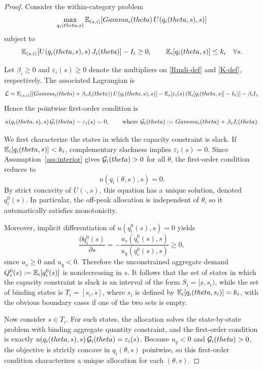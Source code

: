 \documentclass[master.tex]{subfiles}
\begin{document}
\begin{proof}
Consider the within-category problem
\[
\max_{q_i(theta,s)} 
\mathbb{E}_{(s,i)}\!\left[Gamma_i(theta)\,U\!\left(q_i(theta,s),s\right)\right]
\]
subject to
\[
\mathbb{E}_{(s,i)}\!\left[U\!\left(q_i(theta,s),s\right)J_i(theta)\right]-I_i \ge 0,
\qquad
\mathbb{E}_i\!\left[q_i(theta,s)\right]\le k_i
\quad \forall s.
\]

Let \(\beta_i \ge 0\) and \(\varepsilon_i(s)\ge 0\) denote the multipliers on \eqref{Rmdi-def} and \eqref{K-def}, respectively. The associated Lagrangian is
\[
\mathcal L
=
\mathbb{E}_{(s,i)}\!\left[
\left(Gamma_i(theta)+\beta_i J_i(theta)\right)
U\!\left(q_i(theta,s),s\right)
\right]
-
\mathbb{E}_s\!\left[
\varepsilon_i(s)
\left(\mathbb{E}_i[q_i(theta,s)]-k_i\right)
\right]
-
\beta_i I_i.
\]
Hence the pointwise first-order condition is
\[
u\!\left(q_i(theta,s),s\right)\mathcal{G}_i(theta)-\varepsilon_i(s)=0,
\qquad
\text{where }
\mathcal{G}_i(theta):=Gamma_i(theta)+\beta_i J_i(theta).
\]

We first characterize the states in which the capacity constraint is slack. If \(\mathbb{E}_i[q_i(theta,s)]<k_i\), complementary slackness implies \(\varepsilon_i(s)=0\). Since Assumption~\ref{ass:interior} gives \(\mathcal{G}_i(theta)>0\) for all \(\theta\), the first-order condition reduces to
\[
u\!\left(q_i(\theta,s),s\right)=0.
\]
By strict concavity of \(U(\cdot,s)\), this equation has a unique solution, denoted \(q_i^0(s)\). In particular, the off-peak allocation is independent of \(\theta\), so it automatically satisfies monotonicity.

Moreover, implicit differentiation of \(u(q_i^0(s),s)=0\) yields
\[
\frac{\partial q_i^0(s)}{\partial s}
=
-\frac{u_s\!\left(q_i^0(s),s\right)}{u_q\!\left(q_i^0(s),s\right)}
\ge 0,
\]
since \(u_s\ge 0\) and \(u_q<0\). Therefore the unconstrained aggregate demand $Q_i^0(s):=\mathbb{E}_i[q_i^0(s)]$ is nondecreasing in \(s\). It follows that the set of states in which the capacity constraint is slack is an interval of the form \(S_i=[\underline s,s_i)\), while the set of binding states is \(T_i=[s_i,\overline s]\), where \(s_i\) is defined by $\mathbb{E}_i\!\left[q_i(theta,s_i)\right]=k_i$, with the obvious boundary cases if one of the two sets is empty.

Now consider \(s\in T_i\). For such states, the allocation solves the state-by-state problem with binding aggregate quantity constraint, and the first-order condition is exactly $u\!\left(q_i(theta,s),s\right)\mathcal{G}_i(theta) = \varepsilon_i(s)$. Because \(u_q<0\) and \(\mathcal{G}_i(theta)>0\), the objective is strictly concave in \(q_i(\theta,s)\) pointwise, so this first-order condition characterizes a unique allocation for each \((\theta,s)\).


\end{proof}
\end{document}
